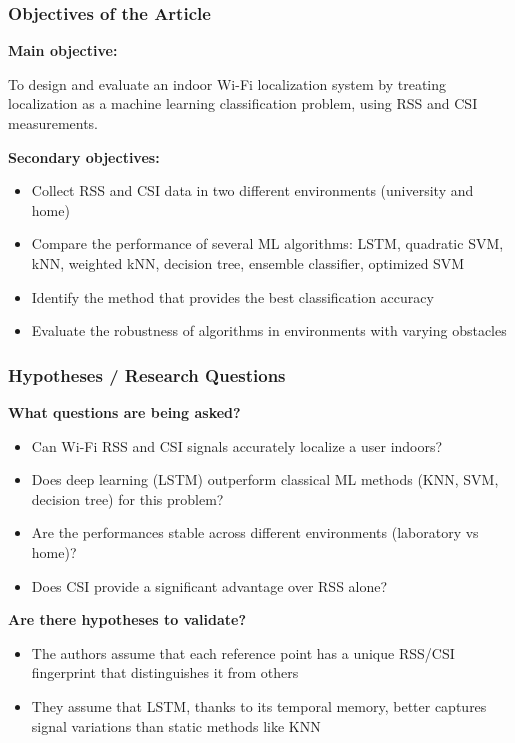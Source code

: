 \documentclass{ipgpmaster}
\begin{document}
\subsubsection{\textbf{Objectives of the Article}}

\textbf{Main objective:}

 To design and evaluate an indoor Wi-Fi localization system by treating localization as a machine learning classification problem, using RSS and CSI measurements.

\textbf{Secondary objectives:}

\begin{itemize}
    \item Collect RSS and CSI data in two different environments (university and home) 
    \item Compare the performance of several ML algorithms: LSTM, quadratic SVM, kNN, weighted kNN, decision tree, ensemble classifier, optimized SVM 
    \item Identify the method that provides the best classification accuracy 
    \item Evaluate the robustness of algorithms in environments with varying obstacles 
\end{itemize}
 

\subsubsection{\textbf{Hypotheses / Research Questions}}

\textbf{What questions are being asked?}

\begin{itemize}
    \item Can Wi-Fi RSS and CSI signals accurately localize a user indoors? 
    \item Does deep learning (LSTM) outperform classical ML methods (KNN, SVM, decision tree) for this problem? 
    \item Are the performances stable across different environments (laboratory vs home)? 
    \item Does CSI provide a significant advantage over RSS alone? 
\end{itemize}
\textbf{Are there hypotheses to validate?}

\begin{itemize}
    \item The authors assume that each reference point has a unique RSS/CSI fingerprint that distinguishes it from others 
    \item They assume that LSTM, thanks to its temporal memory, better captures signal variations than static methods like KNN 
\end{itemize}
\end{document}
